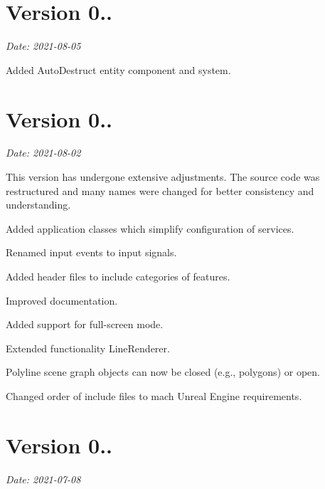 \section*{Version 0..}

{\itshape Date\+: 2021-\/08-\/05}


\begin{DoxyItemize}
\item Added Auto\+Destruct entity component and system.
\end{DoxyItemize}

\section*{Version 0..}

{\itshape Date\+: 2021-\/08-\/02}

This version has undergone extensive adjustments. The source code was restructured and many names were changed for better consistency and understanding.


\begin{DoxyItemize}
\item Added application classes which simplify configuration of services.
\item Renamed input events to input signals.
\item Added header files to include categories of features.
\item Improved documentation.
\item Added support for full-\/screen mode.
\item Extended functionality {\ttfamily Line\+Renderer}.
\item Polyline scene graph objects can now be closed (e.\+g., polygons) or open.
\item Changed order of include files to mach Unreal Engine requirements.
\end{DoxyItemize}

\section*{Version 0..}

{\itshape Date\+: 2021-\/07-\/08}


